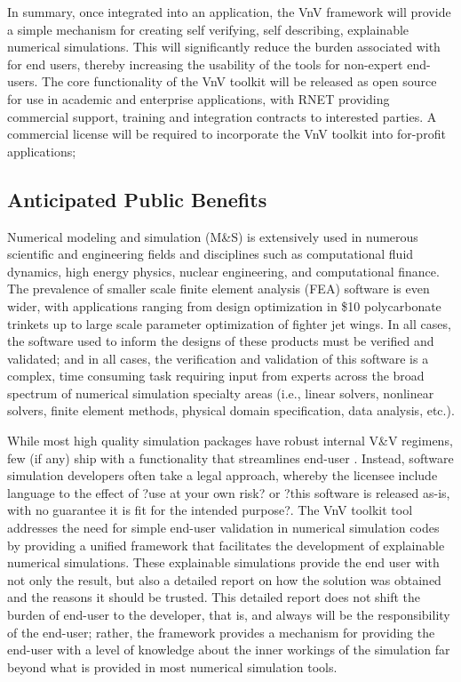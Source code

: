 In summary, once integrated into an application, the VnV framework will provide a simple mechanism for creating self verifying, self describing, explainable numerical simulations. This will significantly reduce the burden associated with \VV for end users, thereby increasing the usability of the tools for non-expert end-users. The core functionality of the VnV toolkit will be released as open source for use in academic and enterprise applications, with RNET providing commercial support, training and integration contracts to interested parties. A commercial license will be required to incorporate the VnV toolkit into for-profit applications;


\subsection{Anticipated Public Benefits}
Numerical modeling and simulation (M\&S) is extensively used in numerous scientific and engineering fields and disciplines such as computational fluid dynamics, high energy physics, nuclear engineering, and computational finance. The prevalence of smaller scale finite element analysis (FEA) software is even wider, with applications ranging from design optimization in \$10 polycarbonate trinkets up to large scale parameter optimization of fighter jet wings. In all cases, the software used to inform the designs of these products must be verified and validated; and in all cases, the verification and validation of this software is a complex, time consuming task requiring input from experts across the broad spectrum of numerical simulation specialty areas (i.e., linear solvers, nonlinear solvers, finite element methods, physical domain specification, data analysis, etc.). 

While most high quality simulation packages have robust internal V\&V regimens, few (if any) ship with a functionality that streamlines end-user \VV. Instead, software simulation developers often take a legal approach, whereby the licensee include language to the effect of ?use at your own risk? or ?this software is released as-is, with no guarantee it is fit for the intended purpose?. The VnV toolkit tool addresses the need for simple end-user validation in numerical simulation codes by providing a unified framework that facilitates the development of explainable numerical simulations. These explainable simulations provide the end user with not only the result, but also a detailed report on how the solution was obtained and the reasons it should be trusted. This detailed report does not shift the burden of end-user \VV to the developer, that is, and always will be the responsibility of the end-user; rather, the framework provides a mechanism for providing the end-user with a level of knowledge about the inner workings of the simulation far beyond what is provided in most numerical simulation tools. 


